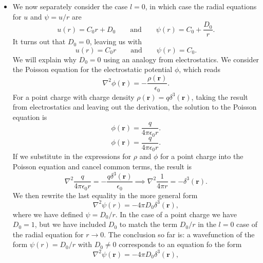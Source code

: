 \documentclass[11pt, a4paper]{article}
\renewcommand{\laplacian}{\nabla^{2}}
\renewcommand{\vec}[1]{\bm{#1}}  %
\renewcommand{\r}{\vec{r}}  %
\newcommand{\p}{\psi}  %
\begin{document}
\begin{itemize}
    \item We now separately consider the case $ l = 0 $, in which case the radial equations for $ u $ and $ \psi = u/r $ are
    \begin{equation*}
        u(r) = C_{0}r + D_{0} \qquad \text{and} \qquad \psi(r) = C_{0} + \frac{D_{0}}{r}.
    \end{equation*}
    It turns out that $ D_{0} = 0 $, leaving us with 
    \begin{equation*}
        u(r) = C_{0}r \qquad \text{and} \qquad \psi(r) = C_{0}.
    \end{equation*}
    We will explain why $ D_{0} = 0 $ using an analogy from electrostatics. We consider the Poisson equation for the electrostatic potential $ \phi $, which reads
	\begin{equation*}
		\laplacian \phi(\r) = -\frac{\rho(\r)}{\epsilon_{0}}.
	\end{equation*}
    For a point charge with charge density $ \rho(\r) = q \delta^{3}(\r) $, taking the result from electrostatics and leaving out the derivation, the solution to the Poisson equation is
	\begin{equation*}
		\phi(\r) = \frac{q}{4\pi \epsilon_{0}r}.
	\end{equation*}
	\begin{equation*}
		\phi(\r) = \frac{q}{4\pi \epsilon_{0}r}.
	\end{equation*}
	If we substitute in the expressions for $ \rho $ and $ \phi $ for a point charge into the Poisson equation and cancel common terms, the result is
    \begin{equation*}
        \laplacian \frac{q}{4 \pi \epsilon_{0} r} = - \frac{q \delta^{3}(\r)}{\epsilon_{0}} \implies \laplacian \frac{1}{4\pi r} = - \delta^{3}(\r).
    \end{equation*}
    We then rewrite the last equality in the more general form
    \begin{equation*}
        \laplacian \psi(r) = - 4 \pi D_{0} \delta^{3}(\r),
    \end{equation*}
    where we have defined $ \psi = D_{0}/r $. In the case of a point charge we have $ D_{0} = 1 $, but we have included $ D_{0} $ to match the term $ D_{0}/r $ in the $ l = 0 $ case of the radial equation for $ r \to 0 $. The conclusion so far is: a wavefunction of the form $ \psi(r) = D_{0}/r $ with $ D_{0} \neq 0 $ corresponds to an equation fo the form 
	\begin{equation*}
		\laplacian \p(\r) = - 4 \pi D_{0} \delta^{3}(\r),
	\end{equation*}

\end{itemize}
\end{document}
